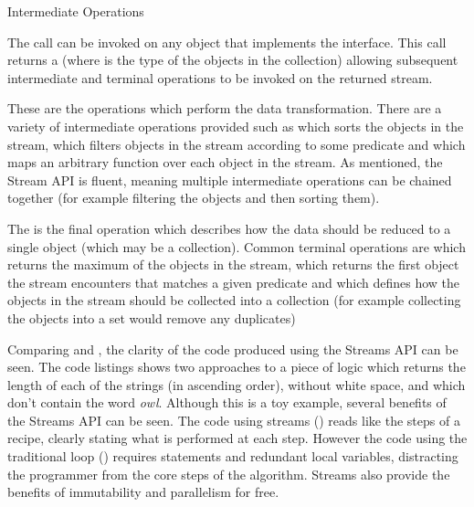 \begin{labeling}{Intermediate Operations  }
	\item [Initial stream call] The  call can be invoked on any object that implements the  interface. This call returns a  (where  is the type of the objects in the collection) allowing subsequent intermediate and terminal operations to be invoked on the returned stream.
	\item [Intermediate Operations  ] These are the operations which perform the data transformation. There are a variety of intermediate operations provided such as  which sorts the objects in the stream,  which filters objects in the stream according to some predicate and  which maps an arbitrary function over each object in the stream. As mentioned, the Stream API is fluent, meaning multiple intermediate operations can be chained together (for example filtering the objects and then sorting them).
	\item [Terminal Operations] The is the final operation which describes how the data should be reduced to a single object (which may be a collection). Common terminal operations are  which returns the maximum of the objects in the stream,  which returns the first object the stream encounters that matches a given predicate and  which defines how the objects in the stream should be collected into a collection (for example collecting the objects into a set would remove any duplicates)
\end{labeling}

Comparing  and , the clarity of the code produced using the Streams API can be seen. The code listings shows two approaches to a piece of logic which returns the length of each of the strings (in ascending order), without white space, and which don't contain the word \textit{owl}. Although this is a toy example, several benefits of the Streams API can be seen. The code using streams () reads like the steps of a recipe, clearly stating what is performed at each step. However the code using the traditional  loop () requires  statements and redundant local variables, distracting the programmer from the core steps of the algorithm. Streams also provide the benefits of immutability and parallelism for free.



